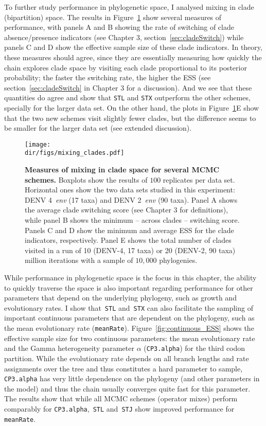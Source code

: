 To further study performance in phylogenetic space, I analysed mixing in clade (bipartition) space.
The results in Figure~\ref{fig:mixing_clades} show several measures of performance, with panels A and B showing the rate of switching of clade absence/presence indicators (see Chapter 3, section~\ref{sec:cladeSwitch}) while panels C and D show the effective sample size of these clade indicators.
In theory, these measures should agree, since they are essentially measuring how quickly the chain explores clade space by visiting each clade proportional to its posterior probability; the faster the switching rate, the higher the ESS (see section~\ref{sec:cladeSwitch} in Chapter 3 for a discussion).
And we see that these quantities do agree and show that \verb|STL| and \verb|STX|  outperform the other schemes, specially for the larger data set.
On the other hand, the plots in Figure~\ref{fig:mixing_clades}E show that the two new schemes visit slightly fewer clades, but the difference seems to be smaller for the larger data set (see extended discussion).

\begin{figure}[!ht]
\begin{center}
\texttt{[image: \\dir/figs/mixing\_clades.pdf]} 
\end{center}
 \caption[Measures of mixing in clade space for several MCMC schemes.]{\textbf{Measures of mixing in clade space for several MCMC schemes.}
  Boxplots show the results of $100$ replicates per data set.
  Horizontal ones show the two data sets studied in this experiment: DENV 4~\textit{env} (17 taxa) and DENV 2~\textit{env} (90 taxa).
  Panel A shows the average clade switching score (see Chapter 3 for definitions), while panel B shows the minimum -- across clades -- switching score.
  Panels C and D show the minimum and average ESS for the clade indicators, respectively.
  Panel E shows the total number of clades visited in a run of 10 (DENV-4, 17 taxa) or 20 (DENV-2, 90 taxa) million iterations with a sample of $10, 000$  phylogenies.
  }
 \label{fig:mixing_clades}
\end{figure}

While performance in phylogenetic space is the focus in this chapter, the ability to quickly traverse the space is also important regarding performance for other parameters that depend on the underlying phylogeny, such as growth and evolutionary rates.
I show that~\verb|STL| and~\verb|STX| can also facilitate the sampling of important continuous parameters that are dependent on the phylogeny, such as the mean evolutionary rate (\verb|meanRate|).
Figure~\ref{fig:continuous_ESS} shows the effective sample size for two continuous parameters: the mean evolutionary rate and the Gamma heterogeneity parameter $\alpha$  (\verb|CP3.alpha|) for the third codon partition.
While the evolutionary rate depends on all branch lengths and rate assignments over the tree and thus constitutes a hard parameter to sample, \verb|CP3.alpha| has very little dependence on the phylogeny (and other parameters in the model) and thus the chain usually converges quite fast for this parameter.
The results show that while all MCMC schemes (operator mixes) perform comparably for \verb|CP3.alpha|,~\verb|STL| and~\verb|STJ| show improved performance for \verb|meanRate|.

